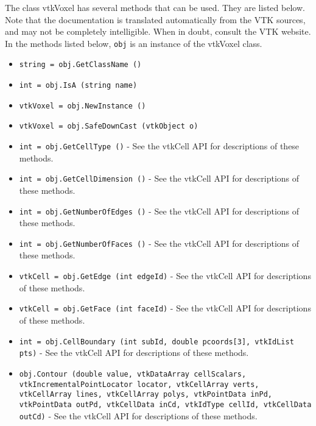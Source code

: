 The class vtkVoxel has several methods that can be used.
  They are listed below.
Note that the documentation is translated automatically from the VTK sources,
and may not be completely intelligible.  When in doubt, consult the VTK website.
In the methods listed below, \verb|obj| is an instance of the vtkVoxel class.
\begin{itemize}
\item  \verb|string = obj.GetClassName ()|

\item  \verb|int = obj.IsA (string name)|

\item  \verb|vtkVoxel = obj.NewInstance ()|

\item  \verb|vtkVoxel = obj.SafeDownCast (vtkObject o)|

\item  \verb|int = obj.GetCellType ()| -  See the vtkCell API for descriptions of these methods.

\item  \verb|int = obj.GetCellDimension ()| -  See the vtkCell API for descriptions of these methods.

\item  \verb|int = obj.GetNumberOfEdges ()| -  See the vtkCell API for descriptions of these methods.

\item  \verb|int = obj.GetNumberOfFaces ()| -  See the vtkCell API for descriptions of these methods.

\item  \verb|vtkCell = obj.GetEdge (int edgeId)| -  See the vtkCell API for descriptions of these methods.

\item  \verb|vtkCell = obj.GetFace (int faceId)| -  See the vtkCell API for descriptions of these methods.

\item  \verb|int = obj.CellBoundary (int subId, double pcoords[3], vtkIdList pts)| -  See the vtkCell API for descriptions of these methods.

\item  \verb|obj.Contour (double value, vtkDataArray cellScalars, vtkIncrementalPointLocator locator, vtkCellArray verts, vtkCellArray lines, vtkCellArray polys, vtkPointData inPd, vtkPointData outPd, vtkCellData inCd, vtkIdType cellId, vtkCellData outCd)| -  See the vtkCell API for descriptions of these methods.


\end{itemize}
